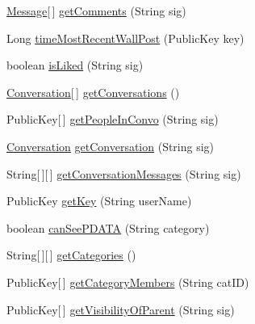 \begin{DoxyCompactItemize}
\item 
\hyperlink{classballmerpeak_1_1turtlenet_1_1shared_1_1Message}{Message}\mbox{[}$\,$\mbox{]} \hyperlink{classballmerpeak_1_1turtlenet_1_1server_1_1Database_a4f77bc5e3bdf13f836136bc7eb763cac}{get\-Comments} (String sig)
\item 
Long \hyperlink{classballmerpeak_1_1turtlenet_1_1server_1_1Database_a4b2795d1417e265aa345d21e5e1c3a23}{time\-Most\-Recent\-Wall\-Post} (Public\-Key key)
\item 
boolean \hyperlink{classballmerpeak_1_1turtlenet_1_1server_1_1Database_a76fdbae3c50e5e2fc64d9973de7e08d9}{is\-Liked} (String sig)
\item 
\hyperlink{classballmerpeak_1_1turtlenet_1_1shared_1_1Conversation}{Conversation}\mbox{[}$\,$\mbox{]} \hyperlink{classballmerpeak_1_1turtlenet_1_1server_1_1Database_ab81803b4c6efc49a774faaba66add16d}{get\-Conversations} ()
\item 
Public\-Key\mbox{[}$\,$\mbox{]} \hyperlink{classballmerpeak_1_1turtlenet_1_1server_1_1Database_ab4048f6c37cc47a31838aa992398cdac}{get\-People\-In\-Convo} (String sig)
\item 
\hyperlink{classballmerpeak_1_1turtlenet_1_1shared_1_1Conversation}{Conversation} \hyperlink{classballmerpeak_1_1turtlenet_1_1server_1_1Database_a85b0c44b683cbbab3f966ce7b266f837}{get\-Conversation} (String sig)
\item 
String\mbox{[}$\,$\mbox{]}\mbox{[}$\,$\mbox{]} \hyperlink{classballmerpeak_1_1turtlenet_1_1server_1_1Database_ac65176a79a8e7433b18e8c98dbc02689}{get\-Conversation\-Messages} (String sig)
\item 
Public\-Key \hyperlink{classballmerpeak_1_1turtlenet_1_1server_1_1Database_a67893a85c22e9e5b5a039f1900817df5}{get\-Key} (String user\-Name)
\item 
boolean \hyperlink{classballmerpeak_1_1turtlenet_1_1server_1_1Database_ac51008e3d60ba40c4afa37287918a5b7}{can\-See\-P\-D\-A\-T\-A} (String category)
\item 
String\mbox{[}$\,$\mbox{]}\mbox{[}$\,$\mbox{]} \hyperlink{classballmerpeak_1_1turtlenet_1_1server_1_1Database_a7f615f18361634692adff5e59c428d84}{get\-Categories} ()
\item 
Public\-Key\mbox{[}$\,$\mbox{]} \hyperlink{classballmerpeak_1_1turtlenet_1_1server_1_1Database_ad6939a97222c8e7da39726b181220aff}{get\-Category\-Members} (String cat\-I\-D)
\item 
Public\-Key\mbox{[}$\,$\mbox{]} \hyperlink{classballmerpeak_1_1turtlenet_1_1server_1_1Database_a9e36a1c14ff02a2cc43b38a646ee20ab}{get\-Visibility\-Of\-Parent} (String sig)

\end{DoxyCompactItemize}
